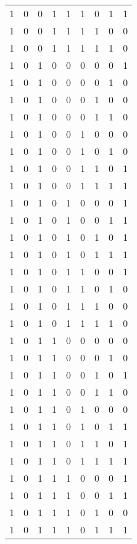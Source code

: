 \begin{longtable}[c]{rrrrrrrrr}
        1 & 0 & 0 & 1 & 1 & 1 & 0 & 1 & 1 \\
        1 & 0 & 0 & 1 & 1 & 1 & 1 & 0 & 0 \\
        1 & 0 & 0 & 1 & 1 & 1 & 1 & 1 & 0 \\
        1 & 0 & 1 & 0 & 0 & 0 & 0 & 0 & 1 \\
        1 & 0 & 1 & 0 & 0 & 0 & 0 & 1 & 0 \\
        1 & 0 & 1 & 0 & 0 & 0 & 1 & 0 & 0 \\
        1 & 0 & 1 & 0 & 0 & 0 & 1 & 1 & 0 \\
        1 & 0 & 1 & 0 & 0 & 1 & 0 & 0 & 0 \\
        1 & 0 & 1 & 0 & 0 & 1 & 0 & 1 & 0 \\
        1 & 0 & 1 & 0 & 0 & 1 & 1 & 0 & 1 \\
        1 & 0 & 1 & 0 & 0 & 1 & 1 & 1 & 1 \\
        1 & 0 & 1 & 0 & 1 & 0 & 0 & 0 & 1 \\
        1 & 0 & 1 & 0 & 1 & 0 & 0 & 1 & 1 \\
        1 & 0 & 1 & 0 & 1 & 0 & 1 & 0 & 1 \\
        1 & 0 & 1 & 0 & 1 & 0 & 1 & 1 & 1 \\
        1 & 0 & 1 & 0 & 1 & 1 & 0 & 0 & 1 \\
        1 & 0 & 1 & 0 & 1 & 1 & 0 & 1 & 0 \\
        1 & 0 & 1 & 0 & 1 & 1 & 1 & 0 & 0 \\
        1 & 0 & 1 & 0 & 1 & 1 & 1 & 1 & 0 \\
        1 & 0 & 1 & 1 & 0 & 0 & 0 & 0 & 0 \\
        1 & 0 & 1 & 1 & 0 & 0 & 0 & 1 & 0 \\
        1 & 0 & 1 & 1 & 0 & 0 & 1 & 0 & 1 \\
        1 & 0 & 1 & 1 & 0 & 0 & 1 & 1 & 0 \\
        1 & 0 & 1 & 1 & 0 & 1 & 0 & 0 & 0 \\
        1 & 0 & 1 & 1 & 0 & 1 & 0 & 1 & 1 \\
        1 & 0 & 1 & 1 & 0 & 1 & 1 & 0 & 1 \\
        1 & 0 & 1 & 1 & 0 & 1 & 1 & 1 & 1 \\
        1 & 0 & 1 & 1 & 1 & 0 & 0 & 0 & 1 \\
        1 & 0 & 1 & 1 & 1 & 0 & 0 & 1 & 1 \\
        1 & 0 & 1 & 1 & 1 & 0 & 1 & 0 & 0 \\
        1 & 0 & 1 & 1 & 1 & 0 & 1 & 1 & 1 \\

\end{longtable}
